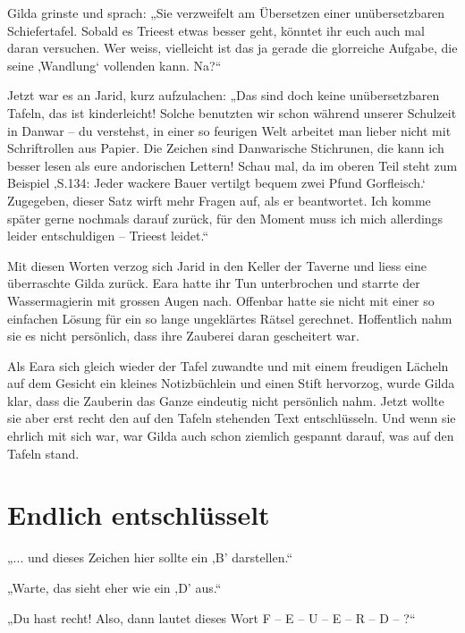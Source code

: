 Gilda grinste und sprach: „Sie verzweifelt am Übersetzen einer unübersetzbaren Schiefertafel. Sobald es Trieest etwas besser geht, könntet ihr euch auch mal daran versuchen. Wer weiss, vielleicht ist das ja gerade die glorreiche Aufgabe, die seine ‚Wandlung‘ vollenden kann. Na?“

Jetzt war es an Jarid, kurz aufzulachen: „Das sind doch keine unübersetzbaren Tafeln, das ist kinderleicht! Solche benutzten wir schon während unserer Schulzeit in Danwar – du verstehst, in einer so feurigen Welt arbeitet man lieber nicht mit Schriftrollen aus Papier. Die Zeichen sind Danwarische Stichrunen, die kann ich besser lesen als eure andorischen Lettern! Schau mal, da im oberen Teil steht zum Beispiel ‚S.134: Jeder wackere Bauer vertilgt bequem zwei Pfund Gorfleisch.‘ Zugegeben, dieser Satz wirft mehr Fragen auf, als er beantwortet. Ich komme später gerne nochmals darauf zurück, für den Moment muss ich mich allerdings leider entschuldigen – Trieest leidet.“

Mit diesen Worten verzog sich Jarid in den Keller der Taverne und liess eine überraschte Gilda zurück. Eara hatte ihr Tun unterbrochen und starrte der Wassermagierin mit grossen Augen nach. Offenbar hatte sie nicht mit einer so einfachen Lösung für ein so lange ungeklärtes Rätsel gerechnet. Hoffentlich nahm sie es nicht persönlich, dass ihre Zauberei daran gescheitert war.

Als Eara sich gleich wieder der Tafel zuwandte und mit einem freudigen Lächeln auf dem Gesicht ein kleines Notizbüchlein und einen Stift hervorzog, wurde Gilda klar, dass die Zauberin das Ganze eindeutig nicht persönlich nahm. Jetzt wollte sie aber erst recht den auf den Tafeln stehenden Text entschlüsseln. Und wenn sie ehrlich mit sich war, war Gilda auch schon ziemlich gespannt darauf, was auf den Tafeln stand.








\newpage
\section{Endlich entschlüsselt}



„... und dieses Zeichen hier sollte ein ‚B’ darstellen.“

„Warte, das sieht eher wie ein ‚D’ aus.“

„Du hast recht! Also, dann lautet dieses Wort F – E – U – E – R – D – ?“

